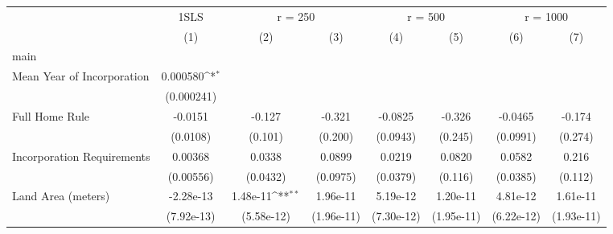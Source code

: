 {
\def\sym#1{\ifmmode^{#1}\else\(^{#1}\)\fi}
\begin{tabular}{l*{7}{c}}
\toprule
                    &\multicolumn{1}{c}{1SLS}&\multicolumn{2}{c}{r = 250}                &\multicolumn{2}{c}{r = 500}                &\multicolumn{2}{c}{r = 1000}               \\
                    &\multicolumn{1}{c}{(1)}         &\multicolumn{1}{c}{(2)}         &\multicolumn{1}{c}{(3)}         &\multicolumn{1}{c}{(4)}         &\multicolumn{1}{c}{(5)}         &\multicolumn{1}{c}{(6)}         &\multicolumn{1}{c}{(7)}         \\
\midrule
main                &                     &                     &                     &                     &                     &                     &                     \\
Mean Year of Incorporation&    0.000580\sym{*}  &                     &                     &                     &                     &                     &                     \\
                    &  (0.000241)         &                     &                     &                     &                     &                     &                     \\
\addlinespace
Full Home Rule      &     -0.0151         &      -0.127         &      -0.321         &     -0.0825         &      -0.326         &     -0.0465         &      -0.174         \\
                    &    (0.0108)         &     (0.101)         &     (0.200)         &    (0.0943)         &     (0.245)         &    (0.0991)         &     (0.274)         \\
\addlinespace
Incorporation Requirements&     0.00368         &      0.0338         &      0.0899         &      0.0219         &      0.0820         &      0.0582         &       0.216         \\
                    &   (0.00556)         &    (0.0432)         &    (0.0975)         &    (0.0379)         &     (0.116)         &    (0.0385)         &     (0.112)         \\
\addlinespace
Land Area (meters)  &   -2.28e-13         &    1.48e-11\sym{**} &    1.96e-11         &    5.19e-12         &    1.20e-11         &    4.81e-12         &    1.61e-11         \\
                    &  (7.92e-13)         &  (5.58e-12)         &  (1.96e-11)         &  (7.30e-12)         &  (1.95e-11)         &  (6.22e-12)         &  (1.93e-11)         \\

\end{tabular}}
